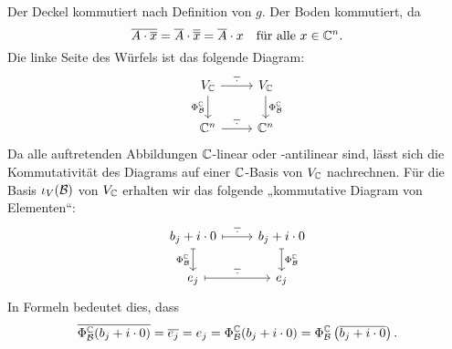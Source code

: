 \documentclass[a4paper,10pt,numbers=noenddot]{scrartcl}
\begin{document}
Der Deckel kommutiert nach Definition von $g$.
Der Boden kommutiert, da
\[
    \overline{A \cdot \overline{x}}
  = \overline{A} \cdot \overline{\overline{x}}
  = \overline{A} \cdot x
  \quad
  \text{für alle $x \in \mathbb{C}^n$}.
\]
Die linke Seite des Würfels ist das folgende Diagram:
\[
  \begin{tikzcd}
      V_\Cbb
      \arrow[r, "\overline{\,\cdot\,}"]
      \arrow[d, "\Phi^\Cbb_\mc{B}"']
    & V_\Cbb
      \arrow[d, "\Phi^\Cbb_\mc{B}"]
    \\
      \Cbb^n
      \arrow[r, "\overline{\,\cdot\,}"]
    & \Cbb^n
  \end{tikzcd}
\]
Da alle auftretenden Abbildungen $\mathbb{C}$-linear oder -antilinear sind, lässt sich die Kommutativität des Diagrams auf einer $\mathbb{C}$-Basis von $V_{\mathbb{C}}$ nachrechnen.
Für die Basis $\iota_V(\mathcal{B})$ von $V_{\mathbb{C}}$ erhalten wir das folgende „kommutative Diagram von Elementen“:
\[
  \begin{tikzcd}
      b_j + i \cdot 0
      \arrow[r, maps to, "\overline{\,\cdot\,}"]
      \arrow[d, maps to, "\Phi^\Cbb_\mc{B}"']
    & b_j + i \cdot 0
      \arrow[d, maps to, "\Phi^\Cbb_\mc{B}"]
    \\
      e_j
      \arrow[r, maps to, "\overline{\,\cdot\,}"]
    & e_j
  \end{tikzcd}
\]
In Formeln bedeutet dies, dass
\[
    \overline{\Phi^{\mathbb{C}}_{\mathcal{B}}(b_j + i \cdot 0)}
  = \overline{e_j}
  = e_j
  = \Phi^{\mathbb{C}}_{\mathcal{B}}(b_j + i \cdot 0)
  = \Phi^{\mathbb{C}}_{\mathcal{B}}\left( \overline{b_j + i \cdot 0} \right).
\]
\end{document}
